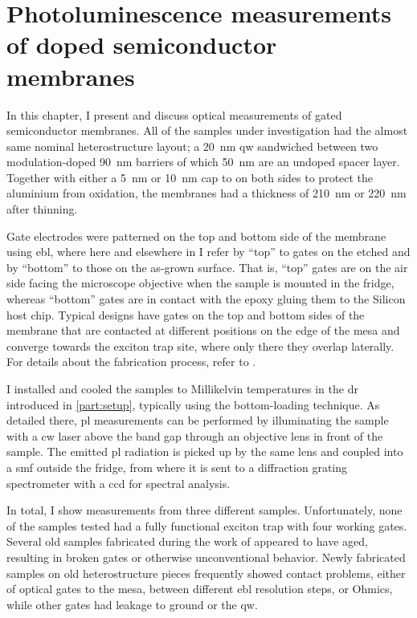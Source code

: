 \chapter{Photoluminescence measurements of doped semiconductor membranes}\label{ch:exp:observations}
In this chapter, I present and discuss optical measurements of gated semiconductor membranes.
All of the samples under investigation had the almost same nominal heterostructure layout; a \qty{20}{\nano\meter}  \gls{qw} sandwiched between two modulation-doped \qty{90}{\nano\meter}  barriers of which \qty{50}{\nano\meter} are an undoped spacer layer.
Together with either a \qty{5}{\nano\meter} or \qty{10}{\nano\meter}  cap to on both sides to protect the aluminium from oxidation, the membranes had a thickness of \qty{210}{\nano\meter} or \qty{220}{\nano\meter} after thinning.

Gate electrodes were patterned on the top and bottom side of the membrane using \gls{ebl}, where here and elsewhere in \thethesis I refer by \enquote{top} to gates on the etched and by \enquote{bottom} to those on the as-grown surface.
That is, \enquote{top} gates are on the air side facing the microscope objective when the sample is mounted in the fridge, whereas \enquote{bottom} gates are in contact with the epoxy gluing them to the Silicon host chip.
Typical designs have gates on the top and bottom sides of the membrane that are contacted at different positions on the edge of the mesa and converge towards the exciton trap site, where only there they overlap laterally.
For details about the fabrication process, refer to .

I installed and cooled the samples to Millikelvin temperatures in the \gls{dr} introduced in \cref{part:setup}, typically using the bottom-loading technique.
As detailed there, \gls{pl} measurements can be performed by illuminating the sample with a \gls{cw} laser above the band gap through an objective lens in front of the sample.
The emitted \gls{pl} radiation is picked up by the same lens and coupled into a \gls{smf} outside the fridge, from where it is sent to a diffraction grating spectrometer with a \gls{ccd} for spectral analysis.

In total, I show measurements from three different samples.
Unfortunately, none of the samples tested had a fully functional exciton trap with four working gates.
Several old samples fabricated during the work of \citet{Descamps2021} appeared to have aged, resulting in broken gates or otherwise unconventional behavior.
Newly fabricated samples on old heterostructure pieces frequently showed contact problems, either of optical gates to the mesa, between different \gls{ebl} resolution steps, or Ohmics, while other gates had leakage to ground or the \gls{qw}.

